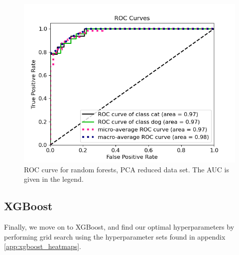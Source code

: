 \documentclass[a4paper]{article}
\begin{document}
\begin{figure}[H]
	\centering
	\includegraphics[scale=0.6]{../figures/random_forest/roc_nbins200_pca35_seed4155_ts0.20.png}
	\caption{ROC curve for random forests, PCA reduced data set. The AUC is given in the legend.}
	\label{fig:rf_roc_pca}
\end{figure}	


\subsection{XGBoost}
Finally, we move on to XGBoost, and find our optimal hyperparameters by performing grid search using the hyperparameter sets found in appendix \ref{app:xgboost_heatmaps}.
\end{document}
